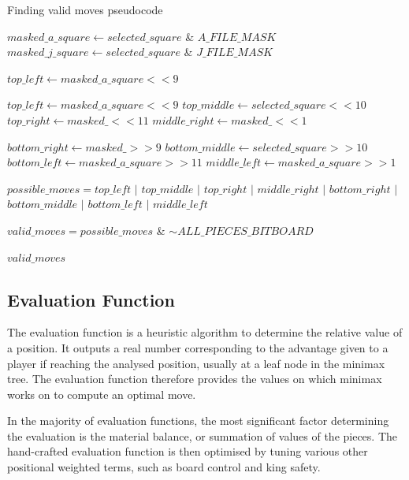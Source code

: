 \documentclass[../main/main.tex]{subfiles}
\begin{document}
\begin{algorithm}[H]
\caption{Finding valid moves pseudocode}
\label{alg:valid-moves}
\begin{algorithmic}
    \State $masked\_a\_square \gets selected\_square$ \&  $A\_FILE\_MASK$
    \State $masked\_j\_square \gets selected\_square$ \& $J\_FILE\_MASK$

    \bigskip

    \State $top\_left \gets masked\_a\_square << 9$

	\State $top\_left \gets masked\_a\_square << 9$
	\State $top\_middle \gets selected\_square << 10$
	\State $top\_right \gets masked\_ << 11$
	\State $middle\_right \gets masked\_ << 1$

	\State $bottom\_right \gets masked\_ >> 9$
	\State $bottom\_middle \gets selected\_square >> 10$
	\State $bottom\_left \gets masked\_a\_square >> 11$
	\State $middle\_left \gets masked\_a\_square >> 1$

    \bigskip

    \State $possible\_moves = top\_left$ $\vert$ $top\_middle$ $\vert$ $top\_right$ $\vert$ $middle\_right$ $\vert$ $bottom\_right$ $\vert$ $bottom\_middle$ $\vert$ $bottom\_left$ $\vert$ $middle\_left$

    \State $valid\_moves = possible\_moves$ \& $\sim ALL\_PIECES\_BITBOARD$

    \bigskip

    \State \Return $valid\_moves$
    \EndFunction
\end{algorithmic}
\end{algorithm}

\subsection{Evaluation Function}
\label{sec:design-evaluation}
The evaluation function is a heuristic algorithm to determine the relative value of a position. It outputs a real number corresponding to the advantage given to a player if reaching the analysed position, usually at a leaf node in the minimax tree. The evaluation function therefore provides the values on which minimax works on to compute an optimal move.

In the majority of evaluation functions, the most significant factor determining the evaluation is the material balance, or summation of values of the pieces. The hand-crafted evaluation function is then optimised by tuning various other positional weighted terms, such as board control and king safety.
\end{document}
